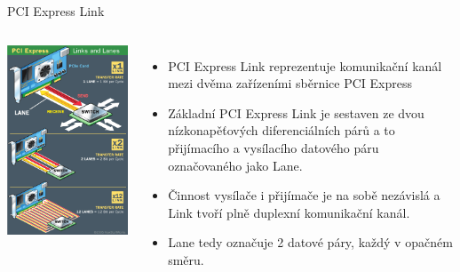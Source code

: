 \documentclass[aspectratio=43]{beamer}
\begin{document}
\begin{frame}{PCI Express Link}
	
	\begin{columns}
		\includegraphics[width=1\linewidth]{extrahovane_obrazky/img_2_page7_0.png}
		\begin{itemize}
			\item PCI Express Link reprezentuje komunikační kanál mezi dvěma zařízeními sběrnice PCI Express
			\item Základní PCI Express Link je sestaven ze dvou nízkonapěťových diferenciálních párů a to přijímacího a vysílacího datového páru označovaného jako Lane.
			\item Činnost vysílače i přijímače je na sobě nezávislá a Link tvoří plně duplexní komunikační kanál.
			\item Lane tedy označuje 2 datové páry, každý v opačném směru.
		\end{itemize}
	\end{columns}
	
\end{frame}
\end{document}
